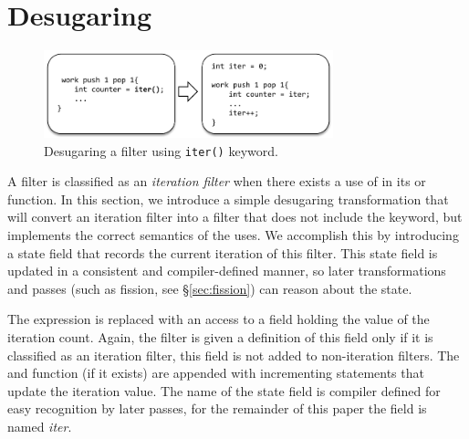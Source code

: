 \section{Desugaring}
\label{sec:desugar}

%
%
%
%
%
%
%
%
%
%


\begin{figure}[t!]
\centering
\includegraphics[width=3.3in]{figures/desugaring.pdf} 
\caption{Desugaring a filter using \texttt{iter()} keyword.\protect\label{fig:desugar}}
\end{figure}


A filter is classified as an {\it iteration filter} when there exists a use of
\iter in its \prework or \work function.  In this section, we
introduce a simple desugaring transformation that will convert an
iteration filter into a filter that does not include the \iter
keyword, but implements the correct semantics of the \iter uses.  We
accomplish this by introducing a state field that records the current
iteration of this filter.  This state field is updated in a consistent
and compiler-defined manner, so later transformations and passes (such
as fission, see \S\ref{sec:fission}) can reason about the
state.  

The \iter expression is replaced with an access to a field holding the
value of the iteration count.  Again, the filter is given a definition
of this field only if it is classified as an iteration filter, this
field is not added to non-iteration filters.  The \work and \prework
function (if it exists) are appended with incrementing statements that
update the iteration value.  The name of the state field is compiler
defined for easy recognition by later passes, for the remainder of
this paper the field is named {\it iter}.


